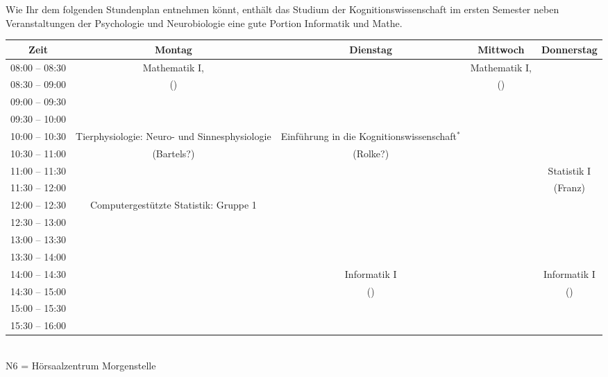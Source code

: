 Wie Ihr dem folgenden Stundenplan entnehmen könnt, enthält das Studium der Kognitionswissenschaft
im ersten Semester neben Veranstaltungen der Psychologie und Neurobiologie eine gute Portion Informatik und Mathe.\\


\noindent{}

\begin{center} 
\footnotesize
\begin{tabular}{|c|c|c|c|c|} \hline
Zeit      & 			Montag 		& Dienstag							& Mittwoch 			& Donnerstag  \\\hline\hline
08:00 -- 08:30  & 		Mathematik I, 	&									& Mathematik I, 	& \\
\cline{1-1}\cline{3-3}\cline{5-5}
08:30 -- 09:00  & 	(\Matheprof)	 & 									& (\Matheprof)	&  \\
\hline
09:00 -- 09:30  & 		 & 									& 	&  \\
\hline
09:30 -- 10:00 &  & & &\\
\hline
10:00 -- 10:30  &   Tierphysiologie: Neuro- und Sinnesphysiologie& Einführung in die Kognitionswissenschaft$^*$& & \\
\cline{1-1}\cline{4-5}
10:30 -- 11:00 &   (Bartels?)  &  (Rolke?) & & \\
\hline
11:00 -- 11:30 &  &  & 					& Statistik I \\
\cline{1-4}
11:30 -- 12:00 & 	&	& 					& (Franz)\\
\hline
12:00 -- 12:30 & Computergestützte Statistik: Gruppe 1& & & \\
\hline
12:30 -- 13:00 & & & & \\
\hline
13:00 -- 13:30 & & & & \\
\hline
13:30 -- 14:00 & & & & \\
\hline
14:00 -- 14:30 &  						&	Informatik I					&					 &   Informatik I\\
\cline{1-2}\cline{4-4}
14:30 -- 15:00 &  						&   (\Infoprof)				&					&   (\Infoprof)	\\
\hline
15:00 -- 15:30 & & & &\\
\hline
15:30 -- 16:00 & & & &\\
\hline
\end{tabular}\\
\scriptsize  N6 = Hörsaalzentrum Morgenstelle
\end{center}


